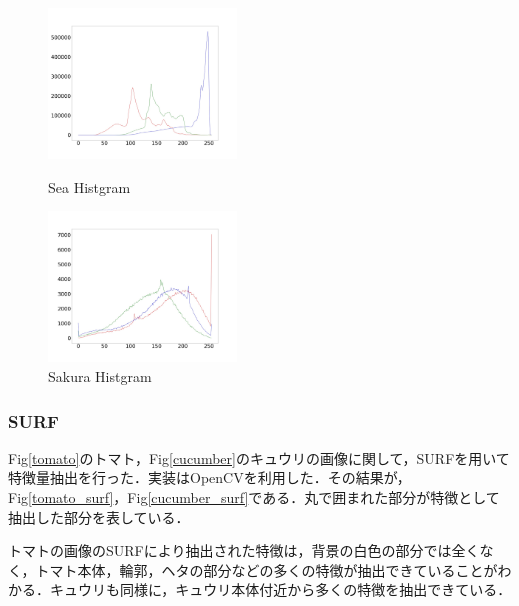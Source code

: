 \documentclass[11pt,a4j]{jarticle}
\begin{document}
\begin{figure}[ht]
	\begin{minipage}{0.5\hsize}
		\centering
		\includegraphics[width=5cm]{../1_BasicImageProcessing/output/sea_hist.jpg}
		\renewcommand{\figurename}{Fig}
		\caption{Sea Histgram}
		\label{sea_hist}
	\end{minipage}
	\begin{minipage}{0.5\hsize}
		\centering
		\includegraphics[width=5cm]{../1_BasicImageProcessing/output/sakura_hist.jpg}
		\renewcommand{\figurename}{Fig}
		\caption{Sakura Histgram}
		\label{sakura_hist}
	\end{minipage}
\end{figure}

\subsubsection{SURF}
Fig\ref{tomato}のトマト，Fig\ref{cucumber}のキュウリの画像に関して，SURFを用いて特徴量抽出を行った．実装はOpenCVを利用した．その結果が，Fig\ref{tomato_surf}，Fig\ref{cucumber_surf}である．丸で囲まれた部分が特徴として抽出した部分を表している．

トマトの画像のSURFにより抽出された特徴は，背景の白色の部分では全くなく，トマト本体，輪郭，ヘタの部分などの多くの特徴が抽出できていることがわかる．キュウリも同様に，キュウリ本体付近から多くの特徴を抽出できている．\\
\end{document}
